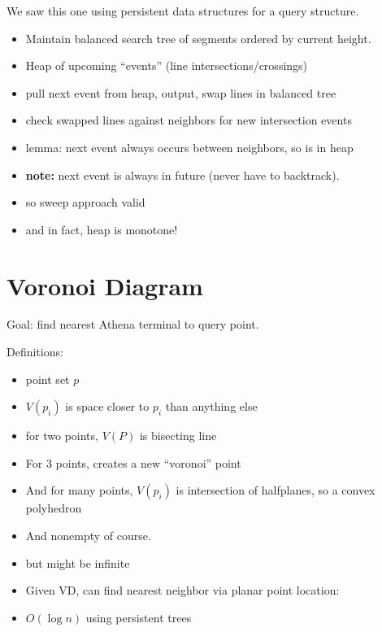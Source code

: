 \documentclass{article}
\begin{document}
We saw this one using persistent data structures for a query structure.
\begin{itemize}
\item Maintain balanced search tree of segments ordered by current height.
\item Heap of upcoming ``events'' (line intersections/crossings)
\item pull next event from heap, output, swap lines in balanced tree
\item check swapped lines against neighbors for new intersection
  events
\item lemma: next event always occurs between neighbors, so is in heap
\item \textbf{ note:} next event is always in future (never have to
  backtrack).
\item so sweep approach valid
\item and in fact, heap is monotone!
\end{itemize}




\section{Voronoi Diagram}

Goal: find nearest Athena terminal to query point.

Definitions:
\begin{itemize}
\item point set $p$
\item $V(p_i)$ is space closer to $p_i$ than anything else
\item for two points, $V(P)$ is bisecting line
\item For 3 points, creates a new ``voronoi'' point
\item And for many points, $V(p_i)$ is intersection of halfplanes, so
  a convex polyhedron
\item And nonempty of course.
\item but might be infinite
\item Given VD, can find nearest neighbor via planar point location:
\item   $O(\log n)$ using persistent trees
\end{itemize}
\end{document}
